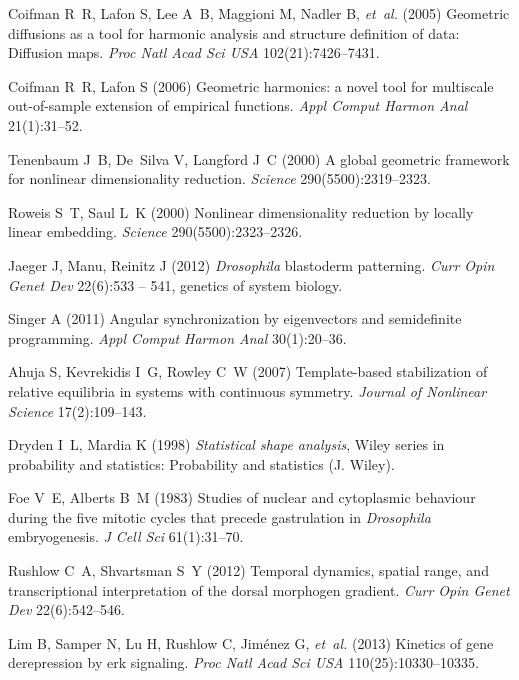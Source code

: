 \documentclass{pnastwo}
\begin{document}
\begin{article}
\begin{thebibliography}{10}
Coifman R~R, Lafon S, Lee A~B, Maggioni M, Nadler B, \textit{et~al.} (2005)
  Geometric diffusions as a tool for harmonic analysis and structure definition
  of data: Diffusion maps. \textit{Proc Natl Acad Sci USA} 102(21):7426--7431.

Coifman R~R, Lafon S (2006) Geometric harmonics: a novel tool for multiscale
  out-of-sample extension of empirical functions. \textit{Appl Comput Harmon Anal} 21(1):31--52.

Tenenbaum J~B, De~Silva V, Langford J~C (2000) A global geometric framework for
  nonlinear dimensionality reduction. \textit{Science} 290(5500):2319--2323.

Roweis S~T, Saul L~K (2000) Nonlinear dimensionality reduction by locally
  linear embedding. \textit{Science} 290(5500):2323--2326.

Jaeger J, Manu, Reinitz J (2012) \textit{{D}rosophila} blastoderm patterning.
  \textit{Curr Opin Genet Dev} 22(6):533 -- 541, genetics of system biology.

Singer A (2011) Angular synchronization by eigenvectors and semidefinite
  programming. \textit{Appl Comput Harmon Anal}
  30(1):20--36.

Ahuja S, Kevrekidis I~G, Rowley C~W (2007) Template-based stabilization of
  relative equilibria in systems with continuous symmetry. \textit{Journal of
  Nonlinear Science} 17(2):109--143.

Dryden I~L, Mardia K (1998) \textit{Statistical shape analysis}, Wiley series
  in probability and statistics: Probability and statistics (J. Wiley).

Foe V~E, Alberts B~M (1983) Studies of nuclear and cytoplasmic behaviour during
  the five mitotic cycles that precede gastrulation in \textit{{D}rosophila}
  embryogenesis. \textit{J Cell Sci} 61(1):31--70.

Rushlow C~A, Shvartsman S~Y (2012) Temporal dynamics, spatial range, and
  transcriptional interpretation of the dorsal morphogen gradient.
  \textit{Curr Opin Genet Dev} 22(6):542--546.

Lim B, Samper N, Lu H, Rushlow C, Jim{\'e}nez G, \textit{et~al.} (2013)
  Kinetics of gene derepression by erk signaling. \textit{Proc Natl Acad Sci USA} 110(25):10330--10335.


\end{thebibliography}
\end{article}
\end{document}
